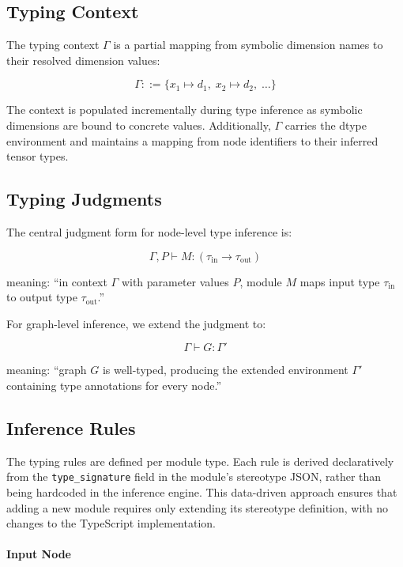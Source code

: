 \documentclass[11pt,a4paper]{article}
\begin{document}
\subsection{Typing Context}

The typing context $\Gamma$ is a partial mapping from symbolic dimension names to their resolved dimension values:

\[
	\Gamma ::= \{ x_1 \mapsto d_1,\; x_2 \mapsto d_2,\; \ldots \}
\]

The context is populated incrementally during type inference as symbolic dimensions are bound to concrete values. Additionally, $\Gamma$ carries the dtype environment and maintains a mapping from node identifiers to their inferred tensor types.

\subsection{Typing Judgments}

The central judgment form for node-level type inference is:

\[
	\Gamma, P \vdash M : (\tau_{\text{in}} \rightarrow \tau_{\text{out}})
\]

meaning: ``in context $\Gamma$ with parameter values $P$, module $M$ maps input type $\tau_{\text{in}}$ to output type $\tau_{\text{out}}$.''

For graph-level inference, we extend the judgment to:

\[
	\Gamma \vdash G : \Gamma'
\]

meaning: ``graph $G$ is well-typed, producing the extended environment $\Gamma'$ containing type annotations for every node.''

\subsection{Inference Rules}

The typing rules are defined per module type. Each rule is derived declaratively from the \texttt{type\_signature} field in the module's stereotype JSON, rather than being hardcoded in the inference engine. This data-driven approach ensures that adding a new module requires only extending its stereotype definition, with no changes to the TypeScript implementation.

\paragraph{Input Node}
\end{document}
